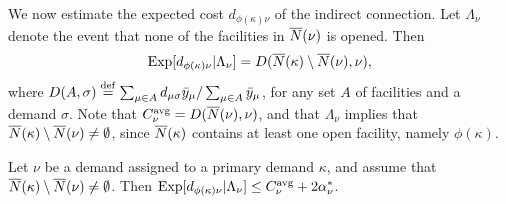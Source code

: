 \documentclass{llncs}
\begin{document}
We now estimate the expected cost $d_{\phi(\kappa)\nu}$ of the indirect
connection. Let $\Lambda_\nu$ denote the event that none of the
facilities in ${\overline{N}}(\nu)$ is opened. Then
%
\begin{equation*}
	\mbox{\rm Exp}[ d_{\phi(\kappa)\nu} | \Lambda_\nu] 
			= D({\overline{N}}(\kappa) \setminus {\overline{N}}(\nu), \nu),
\end{equation*}
%
where $D(A,\sigma) \stackrel{\mathrm{def}}{=}\sum_{\mu\in A}
d_{\mu\sigma}{\bar y}_{\mu}/\sum_{\mu\in A} {\bar y}_{\mu}$, for
any set $A$ of facilities and a demand $\sigma$.
Note that $C^{{\mbox{\scriptsize\rm avg}}}_\nu = D({\overline{N}}(\nu),\nu)$,
and that $\Lambda_\nu$ implies that ${\overline{N}}(\kappa) \setminus {\overline{N}}(\nu)\neq\emptyset$,
since ${\overline{N}}(\kappa)$ contains at least one open facility, namely $\phi(\kappa)$.


\begin{lemma}
  \label{lem:echu indirect}
  Let $\nu$ be a demand assigned to a primary demand $\kappa$, and
assume that ${\overline{N}}(\kappa) \setminus {\overline{N}}(\nu)\neq\emptyset$.
Then $\mbox{\rm Exp}[ d_{\phi(\kappa)\nu} | \Lambda_\nu]  \leq
  		C^{{\mbox{\scriptsize\rm avg}}}_\nu+2\alpha_{\nu}^\ast$.
\end{lemma}
\end{document}
